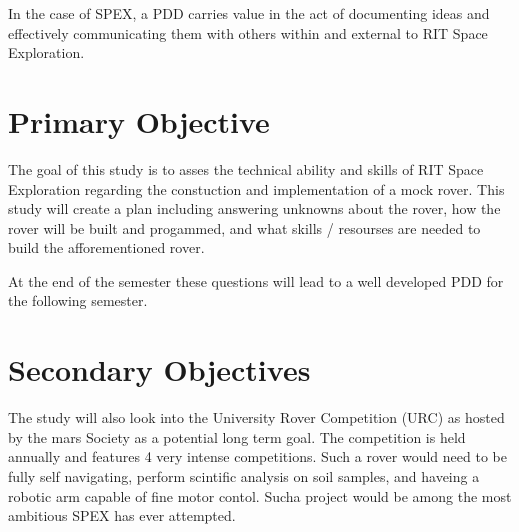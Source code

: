 \documentclass[conference]{IEEEtran} %
\begin{document}
In the case of SPEX, a PDD carries value in the act of documenting ideas and effectively communicating them with others within and external to RIT Space Exploration.

\section{Primary Objective}
\label{sec:primary-obj}

The goal of this study is to asses the technical ability and skills of RIT Space Exploration regarding the constuction and implementation of a mock rover. 
This study will create a plan including answering unknowns about the rover, how the rover will be built and progammed, and what skills / resourses are needed to build the afforementioned rover. 

At the end of the semester these questions will lead to a well developed PDD for the following semester.  


\section{Secondary Objectives}
\label{sec:secondary-obj}
The study will also look into the University Rover Competition (URC) as hosted by the mars Society as a potential long term goal. The competition is held annually and features 4 very intense competitions. Such a rover would need to be fully self navigating, perform scintific analysis on soil samples, and haveing a robotic arm capable of fine motor contol. Sucha project would be among the most ambitious SPEX has ever attempted. 
\end{document}
